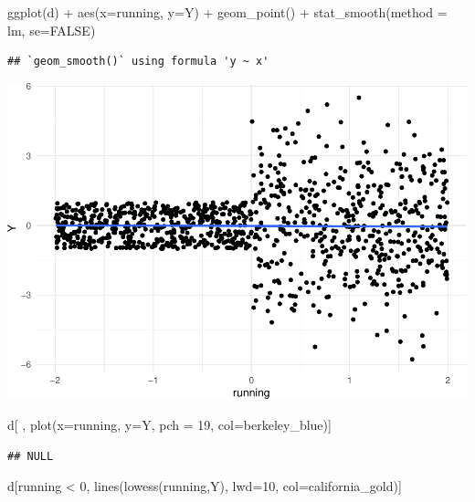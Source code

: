 \documentclass[
]{article}
\newenvironment{Shaded}{\begin{snugshade}}{\end{snugshade}}
\newcommand{\AttributeTok}[1]{\textcolor[rgb]{0.77,0.63,0.00}{#1}}
\newcommand{\ConstantTok}[1]{\textcolor[rgb]{0.00,0.00,0.00}{#1}}
\newcommand{\DecValTok}[1]{\textcolor[rgb]{0.00,0.00,0.81}{#1}}
\newcommand{\FunctionTok}[1]{\textcolor[rgb]{0.00,0.00,0.00}{#1}}
\newcommand{\NormalTok}[1]{#1}
\newcommand{\SpecialCharTok}[1]{\textcolor[rgb]{0.00,0.00,0.00}{#1}}
\newcommand{\StringTok}[1]{\textcolor[rgb]{0.31,0.60,0.02}{#1}}
\begin{document}
\begin{Shaded}
\begin{Highlighting}[]
\FunctionTok{ggplot}\NormalTok{(d) }\SpecialCharTok{+} 
  \FunctionTok{aes}\NormalTok{(}\AttributeTok{x=}\NormalTok{running, }\AttributeTok{y=}\NormalTok{Y) }\SpecialCharTok{+} 
  \FunctionTok{geom\_point}\NormalTok{() }\SpecialCharTok{+} 
  \FunctionTok{stat\_smooth}\NormalTok{(}\AttributeTok{method =} \StringTok{\textquotesingle{}lm\textquotesingle{}}\NormalTok{, }\AttributeTok{se=}\ConstantTok{FALSE}\NormalTok{)}
\end{Highlighting}
\end{Shaded}

\begin{verbatim}
## `geom_smooth()` using formula 'y ~ x'
\end{verbatim}

\includegraphics{241-live-session_files/figure-latex/first rdd plot-1.pdf}

\begin{Shaded}
\begin{Highlighting}[]
\NormalTok{d[ , }\FunctionTok{plot}\NormalTok{(}\AttributeTok{x=}\NormalTok{running, }\AttributeTok{y=}\NormalTok{Y, }\AttributeTok{pch =} \DecValTok{19}\NormalTok{, }\AttributeTok{col=}\NormalTok{berkeley\_blue)]}
\end{Highlighting}
\end{Shaded}

\begin{verbatim}
## NULL
\end{verbatim}

\begin{Shaded}
\begin{Highlighting}[]
\NormalTok{  d[running }\SpecialCharTok{\textless{}} \DecValTok{0}\NormalTok{, }\FunctionTok{lines}\NormalTok{(}\FunctionTok{lowess}\NormalTok{(running,Y), }\AttributeTok{lwd=}\DecValTok{10}\NormalTok{, }\AttributeTok{col=}\NormalTok{california\_gold)]}
\end{Highlighting}
\end{Shaded}
\end{document}
